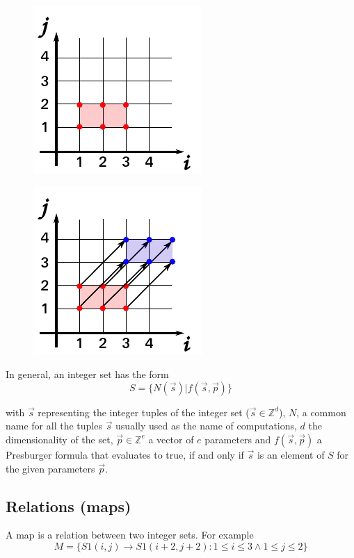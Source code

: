 \begin{figure}[th]
  \begin{minipage}{.22\textwidth}
    \centering
    \includegraphics[scale=0.6]{figures/set.pdf}
    \label{fig:set}
  \end{minipage}
  \begin{minipage}{.22\textwidth}
    \centering
    \includegraphics[scale=0.6]{figures/map.pdf}
    \label{fig:map}
  \end{minipage}
\end{figure}

In general, an integer set has the form
$$S = \{N(\vec{s}) | f(\vec{s}, \vec{p})\}$$

\noindent with $\vec{s}$ representing the integer tuples of
the integer set ($\vec{s} \in \mathbb{Z}^d$), $N$, a common name
for all the tuples $\vec{s}$ usually used as the name of computations, $d$ the dimensionality of the set, $\vec{p} \in \mathbb{Z}^e$ a vector of $e$ parameters and $f(\vec{s}, \vec{p})$ a Presburger formula that evaluates to true, if and only if $\vec{s}$ is an element of $S$ for the given parameters $\vec{p}$.

\subsection{Relations (maps)}
A map is a relation between two integer sets.  For example
$$M = \{S1(i,j) \rightarrow S1(i+2,j+2) : 1 \leq i \leq 3 \wedge 1 \leq j \leq 2\}$$

